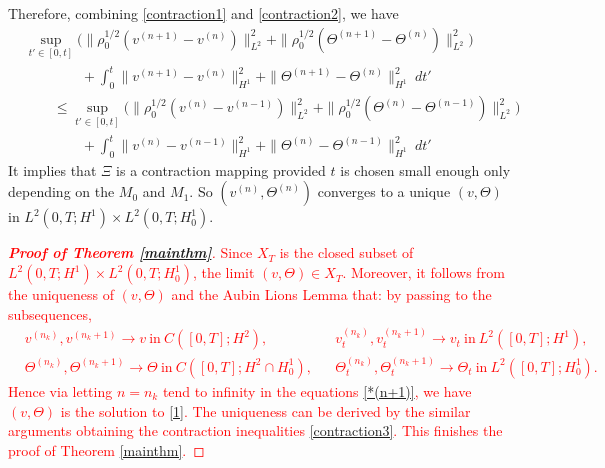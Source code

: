 \documentclass[12pt,a4paper]{amsart}
\numberwithin{equation}{section}
\theoremstyle{plain}
\theoremstyle{definition}
\begin{document}
Therefore, combining \eqref{contraction1} and \eqref{contraction2}, we have
\begin{equation}
\label{contraction3}
\begin{aligned}
&\sup\limits_{t'\in[0,t]}\Big(\|\rho_{0}^{1/2}(v^{(n+1)}-v^{(n)})\|_{L^{2}}^2+\|\rho_{0}^{1/2}(\Theta^{(n+1)}-\Theta^{(n)})\|_{L^{2}}^2\Big)\\
&\qquad\qquad+\int_{0}^{t}\|v^{(n+1)}-v^{(n)}\|_{H^1}^2 +\|\Theta^{(n+1)}-\Theta^{(n)}\|_{H^1}^2\ dt'\\
&\qquad \leq \sup\limits_{t'\in[0,t]}\Big(\|\rho_{0}^{1/2}(v^{(n)}-v^{(n-1)})\|_{L^{2}}^2+\|\rho_{0}^{1/2}(\Theta^{(n)}-\Theta^{(n-1)})\|_{L^{2}}^2\Big)\\
&\qquad\qquad+\int_{0}^{t}\|v^{(n)}-v^{(n-1)}\|_{H^1}^2 +\|\Theta^{(n)}-\Theta^{(n-1)}\|_{H^1}^2\ dt'
\end{aligned}
\end{equation}
It implies that $\Xi$ is a contraction mapping provided $t$ is chosen small enough only depending on the $M_0$ and $M_1$.
So $(v^{(n)},\Theta^{(n)})$ converges to a unique $(v,\Theta)$ in $L^2(0,T;H^1)\times L^2(0,T;H^1_0)$.

\textcolor{red}{\begin{proof}[\textbf{Proof of Theorem \ref{mainthm}}]
		Since $X_T$ is the closed subset of $L^2(0,T;H^1)\times L^2(0,T;H^1_0)$, the limit $(v,\Theta)\in X_T$. Moreover, it follows from the uniqueness of $(v,\Theta)$ and the Aubin Lions Lemma that: by passing to the subsequences, 
		\begin{align*}
		&v^{(n_k)}, v^{(n_k+1)}\rightarrow v~\text{in}~C([0,T];H^2),&&v^{(n_k)}_t, v^{(n_k+1)}_t\rightarrow v_t~\text{in}~L^2([0,T];H^1),\\
		&\Theta^{(n_k)}, \Theta^{(n_k+1)}\rightarrow \Theta~\text{in}~C([0,T];H^2\cap H^1_0),&&\Theta^{(n_k)}_t, \Theta^{(n_k+1)}_t\rightarrow \Theta_t~\text{in}~L^2([0,T];H^1_0).
		\end{align*}
		Hence via letting $n=n_k$ tend to infinity %
		in the equations \eqref{*(n+1)}, we have $(v,\Theta)$ is the solution to \eqref{1}. The uniqueness can be derived by the similar arguments obtaining the contraction inequalities \eqref{contraction3}. This finishes the proof of Theorem \ref{mainthm}.
	\end{proof}
}
\fi
\end{document}
